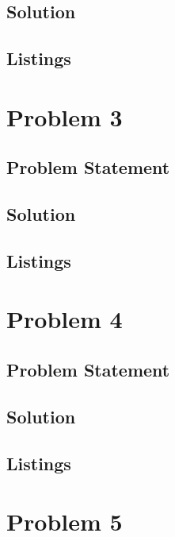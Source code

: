\documentclass[12pt,a4paper,titlepage,oneside]{article}
\begin{document}
\subsection{Solution}

\subsection{Listings}

\newpage
\section{Problem 3}

\subsection{Problem Statement}


\subsection{Solution}

\subsection{Listings}

\newpage
\section{Problem 4}

\subsection{Problem Statement}


\subsection{Solution}

\subsection{Listings}

\newpage
\section{Problem 5}
\end{document}
